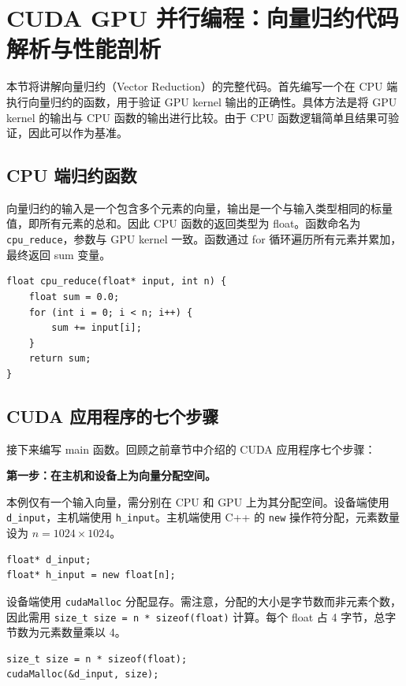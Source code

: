 \section{CUDA GPU 并行编程：向量归约代码解析与性能剖析}

本节将讲解向量归约（Vector Reduction）的完整代码。首先编写一个在 CPU 端执行向量归约的函数，用于验证 GPU kernel 输出的正确性。具体方法是将 GPU kernel 的输出与 CPU 函数的输出进行比较。由于 CPU 函数逻辑简单且结果可验证，因此可以作为基准。

\subsection{CPU 端归约函数}

向量归约的输入是一个包含多个元素的向量，输出是一个与输入类型相同的标量值，即所有元素的总和。因此 CPU 函数的返回类型为 float。函数命名为 \texttt{cpu\_reduce}，参数与 GPU kernel 一致。函数通过 for 循环遍历所有元素并累加，最终返回 sum 变量。

\begin{lstlisting}
float cpu_reduce(float* input, int n) {
    float sum = 0.0;
    for (int i = 0; i < n; i++) {
        sum += input[i];
    }
    return sum;
}
\end{lstlisting}

\subsection{CUDA 应用程序的七个步骤}

接下来编写 main 函数。回顾之前章节中介绍的 CUDA 应用程序七个步骤：

\textbf{第一步：在主机和设备上为向量分配空间。}

本例仅有一个输入向量，需分别在 CPU 和 GPU 上为其分配空间。设备端使用 \texttt{d\_input}，主机端使用 \texttt{h\_input}。主机端使用 C++ 的 \texttt{new} 操作符分配，元素数量设为 $n = 1024 \times 1024$。

\begin{lstlisting}
float* d_input;
float* h_input = new float[n];
\end{lstlisting}

设备端使用 \texttt{cudaMalloc} 分配显存。需注意，分配的大小是字节数而非元素个数，因此需用 \texttt{size\_t size = n * sizeof(float)} 计算。每个 float 占 4 字节，总字节数为元素数量乘以 4。

\begin{lstlisting}
size_t size = n * sizeof(float);
cudaMalloc(&d_input, size);
\end{lstlisting}

